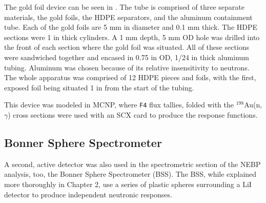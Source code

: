The gold foil device can be seen in .
The tube is comprised of three separate materials, the gold foils, the HDPE separators, and the aluminum containment tube.
Each of the gold foils are 5 mm in diameter and 0.1 mm thick.
The HDPE sections were 1 in thick cylinders.
A 1 mm depth, 5 mm OD hole was drilled into the front of each section where the gold foil was situated.
All of these sections were sandwiched together and encased in 0.75 in OD, 1/24 in thick aluminum tubing.
Aluminum was chosen because of its relative insensitivity to neutrons.
The whole apparatus was comprised of 12 HDPE pieces and foils, with the first, exposed foil being situated 1 in from the start of the tubing.

This device was modeled in MCNP, where {\tt F4} flux tallies, folded with the $^{198}$Au(n,$\gamma$) cross sections were used with an SCX card to produce the response functions.

\subsection{Bonner Sphere Spectrometer}

A second, active detector was also used in the spectrometric section of the NEBP analysis, too, the Bonner Sphere Spectrometer (BSS).
The BSS, while explained more thoroughly in Chapter 2, use a series of plastic spheres surrounding a LiI detector to produce independent neutronic responses.


